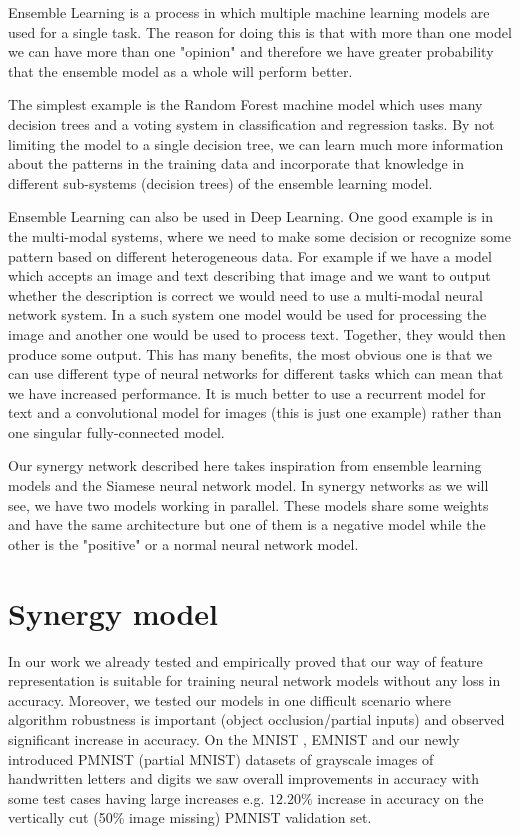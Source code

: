 \documentclass[b5paper]{book}
\let\cite\parencite
\begin{document}
Ensemble Learning is a process in which multiple machine learning models are used for a single task. The reason for doing this is that with more than one model we can have more than one "opinion" and therefore we have greater probability that the ensemble model as a whole will perform better.

The simplest example is the Random Forest machine model which uses many decision trees and a voting system in classification and regression tasks. By not limiting the model to a single decision tree, we can learn much more information about the patterns in the training data and incorporate that knowledge in different sub-systems (decision trees) of the ensemble learning model.

Ensemble Learning can also be used in Deep Learning. One good example is in the multi-modal systems, where we need to make some decision or recognize some pattern based on different heterogeneous data. For example if we have a model which accepts an image and text describing that image and we want to output whether the description is correct we would need to use a multi-modal neural network system. In a such system one model would be used for processing the image and another one would be used to process text. Together, they would then produce some output. This has many benefits, the most obvious one is that we can use different type of neural networks for different tasks which can mean that we have increased performance. It is much better to use a recurrent model for text and a convolutional model for images (this is just one example) rather than one singular fully-connected model.

Our synergy network described here takes inspiration from ensemble learning models and the Siamese neural network model. In synergy networks as we will see, we have two models working in parallel. These models share some weights and have the same architecture but one of them is a negative model while the other is the "positive" or a normal neural network model.


\chapter{Synergy model}

In our work we already tested and empirically proved that our way of feature representation is suitable for training neural network models without any loss in accuracy. Moreover, we tested our models in one difficult scenario where algorithm robustness is important (object occlusion/partial inputs) and observed significant increase in accuracy. On the MNIST \cite{lecun1998mnist}, EMNIST \cite{cohen2017emnist} and our newly introduced PMNIST (partial MNIST) datasets of grayscale images of handwritten letters and digits we saw overall improvements in accuracy with some test cases having large increases e.g. \( 12.20\% \) increase in accuracy on the vertically cut (50\% image missing) PMNIST validation set. 
\end{document}
